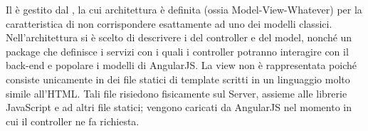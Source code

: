 Il  è gestito dal  , la cui architettura è definita  (ossia Model-View-Whatever) per la caratteristica di non corrispondere esattamente ad uno dei modelli classici. Nell'architettura si è scelto di descrivere i  del controller e del model, nonché un package che definisce i servizi con i quali i controller potranno interagire con il back-end e popolare i modelli di AngularJS. La view non è rappresentata poiché consiste unicamente in dei file statici di template scritti in un linguaggio molto simile all'HTML. Tali file risiedono fisicamente sul Server, assieme alle librerie JavaScript e ad altri file statici; vengono caricati da AngularJS nel momento in cui il controller ne fa richiesta.
